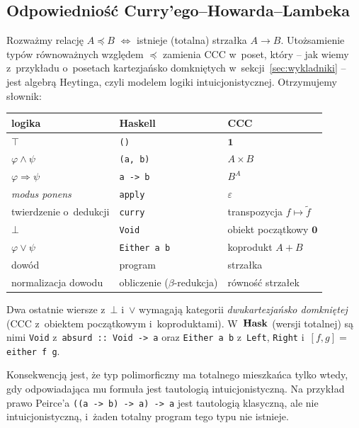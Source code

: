 \subsection*{Odpowiedniość Curry'ego--Howarda--Lambeka}

Rozważmy relację $A\preceq B$ $\iff$ istnieje (totalna) strzałka $A\to B$. Utożsamienie typów równoważnych względem $\preceq$ zamienia CCC w~poset, który -- jak wiemy z~przykładu o~posetach kartezjańsko domkniętych w~sekcji~\ref{sec:wykladniki} -- jest algebrą Heytinga, czyli modelem logiki intuicjonistycznej. Otrzymujemy słownik:
\begin{center}
\renewcommand{\arraystretch}{1.25}
\begin{tabular}{lll}
\textbf{logika} & \textbf{Haskell} & \textbf{CCC} \\ \hline
$\top$ & \lstinline{()} & $\mathbf{1}$ \\
$\varphi\wedge\psi$ & \lstinline{(a, b)} & $A\times B$ \\
$\varphi\Rightarrow\psi$ & \lstinline{a -> b} & $B^A$ \\
\emph{modus ponens} & \lstinline{apply} & $\varepsilon$ \\
twierdzenie o~dedukcji & \lstinline{curry} & transpozycja $f\mapsto\tilde f$ \\
$\bot$ & \lstinline{Void} & obiekt początkowy $\mathbf{0}$ \\
$\varphi\vee\psi$ & \lstinline{Either a b} & koprodukt $A+B$ \\
dowód & program & strzałka \\
normalizacja dowodu & obliczenie ($\beta$-redukcja) & równość strzałek
\end{tabular}
\end{center}
Dwa ostatnie wiersze z~$\bot$ i~$\vee$ wymagają kategorii \emph{dwukartezjańsko domkniętej} (CCC z~obiektem początkowym i~koproduktami). W~$\mathbf{Hask}$ (wersji totalnej) są nimi \lstinline{Void} z~\lstinline{absurd :: Void -> a} oraz \lstinline{Either a b} z~\lstinline{Left}, \lstinline{Right} i~$[f,g] =$ \lstinline{either f g}.

Konsekwencją jest, że typ polimorficzny ma totalnego mieszkańca tylko wtedy, gdy odpowiadająca mu formuła jest tautologią intuicjonistyczną. Na przykład prawo Peirce'a \lstinline{((a -> b) -> a) -> a} jest tautologią klasyczną, ale nie intuicjonistyczną, i~żaden totalny program tego typu nie istnieje.

